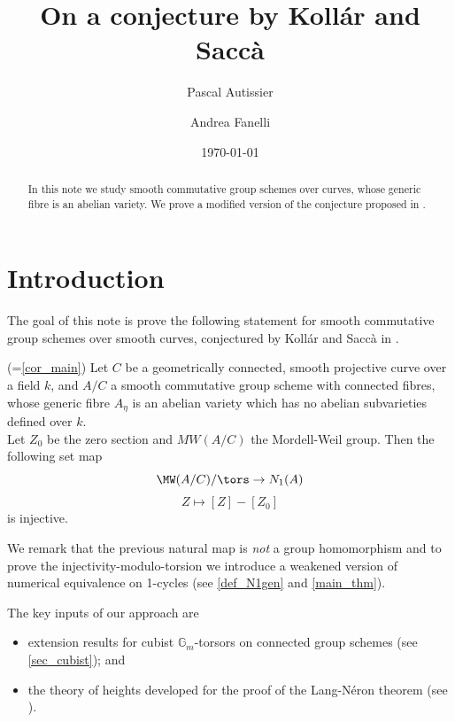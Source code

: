 \documentclass[12pt, english]{amsart}
\title[A conjecture by Kollár and Saccà]{On a conjecture by Kollár and Saccà}
\author[P. Autissier]{Pascal Autissier}
\author[A. Fanelli]{Andrea Fanelli}
\date{\today}
\begin{document}

\begin{abstract}
	In this note we study smooth commutative group schemes over curves, whose generic fibre is an abelian variety. We prove a modified version of the conjecture proposed in \cite{KS25}.
\end{abstract}


\maketitle
\tableofcontents


\section*{Introduction}

The goal of this note is prove the following statement for smooth commutative group schemes over smooth curves, conjectured by Kollár and Saccà in \cite{KS25}.

\begin{theorem*}(=\autoref{cor_main})
Let $C$ be a geometrically connected, smooth projective curve over a field $k$, and $A/C$
a smooth commutative group scheme with connected fibres, whose generic fibre $A_\eta$ is an abelian
variety which has no abelian subvarieties defined over $k$. 
\\Let $Z_0$ be the zero section and $MW(A/C)$ the Mordell-Weil group. Then the following set map
$$\MW(A/C)/{\tors} \to  N_{1}(A)$$
$$Z \mapsto [Z]-[Z_0]$$
is injective.
\end{theorem*}

We remark that the previous natural map is \emph{not} a group homomorphism and to prove the injectivity-modulo-torsion we introduce a weakened version of numerical equivalence on 1-cycles (see \autoref{def_N1gen} and \autoref{main_thm}).

The key inputs of our approach are
\begin{itemize}
\item extension results for cubist $\mathbb{G}_{m}$-torsors on connected group schemes (see \autoref{sec_cubist}); and 
\item the theory of heights developed for the proof of the Lang-Néron theorem (see \cite[Chapter~6]{L83}).
\end{itemize}
\end{document}
